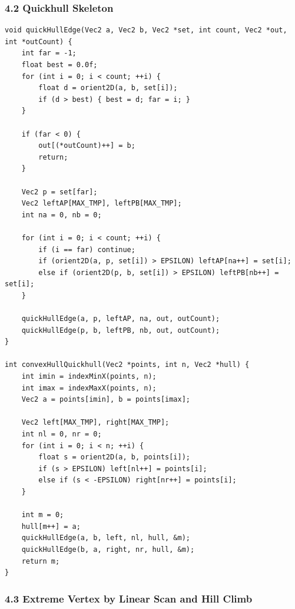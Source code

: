\documentclass[10pt,letterpaper]{article}
\begin{document}
\subsubsection*{4.2 Quickhull Skeleton}

\begin{verbatim}
void quickHullEdge(Vec2 a, Vec2 b, Vec2 *set, int count, Vec2 *out, int *outCount) {
    int far = -1;
    float best = 0.0f;
    for (int i = 0; i < count; ++i) {
        float d = orient2D(a, b, set[i]);
        if (d > best) { best = d; far = i; }
    }

    if (far < 0) {
        out[(*outCount)++] = b;
        return;
    }

    Vec2 p = set[far];
    Vec2 leftAP[MAX_TMP], leftPB[MAX_TMP];
    int na = 0, nb = 0;

    for (int i = 0; i < count; ++i) {
        if (i == far) continue;
        if (orient2D(a, p, set[i]) > EPSILON) leftAP[na++] = set[i];
        else if (orient2D(p, b, set[i]) > EPSILON) leftPB[nb++] = set[i];
    }

    quickHullEdge(a, p, leftAP, na, out, outCount);
    quickHullEdge(p, b, leftPB, nb, out, outCount);
}

int convexHullQuickhull(Vec2 *points, int n, Vec2 *hull) {
    int imin = indexMinX(points, n);
    int imax = indexMaxX(points, n);
    Vec2 a = points[imin], b = points[imax];

    Vec2 left[MAX_TMP], right[MAX_TMP];
    int nl = 0, nr = 0;
    for (int i = 0; i < n; ++i) {
        float s = orient2D(a, b, points[i]);
        if (s > EPSILON) left[nl++] = points[i];
        else if (s < -EPSILON) right[nr++] = points[i];
    }

    int m = 0;
    hull[m++] = a;
    quickHullEdge(a, b, left, nl, hull, &m);
    quickHullEdge(b, a, right, nr, hull, &m);
    return m;
}
\end{verbatim}


\subsubsection*{4.3 Extreme Vertex by Linear Scan and Hill Climb}
\end{document}
